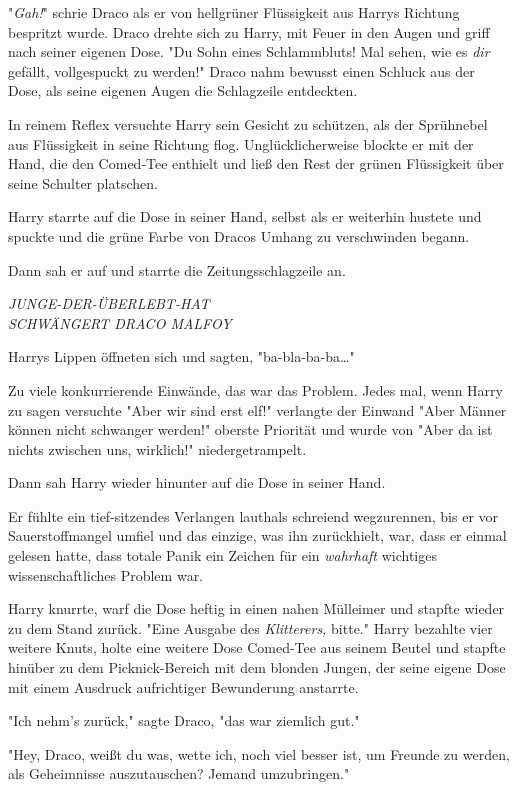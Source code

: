 {"\emph{Gah!}" schrie Draco als er von hellgrüner Flüssigkeit aus Harrys Richtung bespritzt wurde. Draco drehte sich zu Harry, mit Feuer in den Augen und griff nach seiner eigenen Dose. "Du Sohn eines Schlammbluts! Mal sehen, wie es \emph{dir} gefällt, vollgespuckt zu werden!" Draco nahm bewusst einen Schluck aus der Dose, als seine eigenen Augen die Schlagzeile entdeckten.

In reinem Reflex versuchte Harry sein Gesicht zu schützen, als der Sprühnebel aus Flüssigkeit in seine Richtung flog. Unglücklicherweise blockte er mit der Hand, die den Comed-Tee enthielt und ließ den Rest der grünen Flüssigkeit über seine Schulter platschen.

Harry starrte auf die Dose in seiner Hand, selbst als er weiterhin hustete und spuckte und die grüne Farbe von Dracos Umhang zu verschwinden begann.

Dann sah er auf und starrte die Zeitungsschlagzeile an.

\emph{JUNGE-DER-ÜBERLEBT-HAT\\ SCHWÄNGERT DRACO MALFOY}

Harrys Lippen öffneten sich und sagten, "ba-bla-ba-ba…"

Zu viele konkurrierende Einwände, das war das Problem. Jedes mal, wenn Harry zu sagen versuchte "Aber wir sind erst elf!" verlangte der Einwand "Aber Männer können nicht schwanger werden!" oberste Priorität und wurde von "Aber da ist nichts zwischen uns, wirklich!" niedergetrampelt.

Dann sah Harry wieder hinunter auf die Dose in seiner Hand.

Er fühlte ein tief-sitzendes Verlangen lauthals schreiend wegzurennen, bis er vor Sauerstoffmangel umfiel und das einzige, was ihn zurückhielt, war, dass er einmal gelesen hatte, dass totale Panik ein Zeichen für ein \emph{wahrhaft} wichtiges wissenschaftliches Problem war.

Harry knurrte, warf die Dose heftig in einen nahen Mülleimer und stapfte wieder zu dem Stand zurück. "Eine Ausgabe des \emph{Klitterers,} bitte." Harry bezahlte vier weitere Knuts, holte eine weitere Dose Comed-Tee aus seinem Beutel und stapfte hinüber zu dem Picknick-Bereich mit dem blonden Jungen, der seine eigene Dose mit einem Ausdruck aufrichtiger Bewunderung anstarrte.

"Ich nehm's zurück," sagte Draco, "das war ziemlich gut."

"Hey, Draco, weißt du was, wette ich, noch viel besser ist, um Freunde zu werden, als Geheimnisse auszutauschen? Jemand umzubringen."

}
